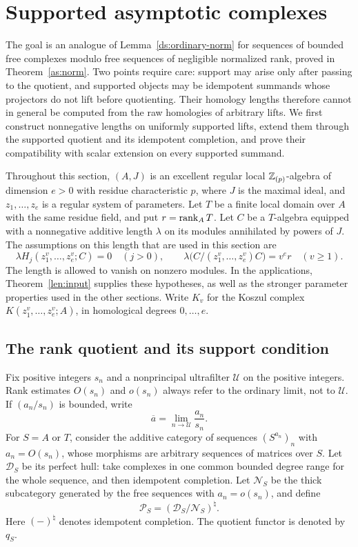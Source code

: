 \section{Supported asymptotic complexes}
\label{sec:asymptotic}

The goal is an analogue of Lemma~\ref{ds:ordinary-norm} for sequences of
bounded free complexes modulo free sequences of negligible normalized
rank, proved in Theorem~\ref{as:norm}. Two points require care: support
may arise only after passing to the quotient, and supported objects may
be idempotent summands whose projectors do not lift before quotienting.
Their homology lengths therefore cannot in general be computed from the
raw homologies of arbitrary lifts. We first construct nonnegative lengths
on uniformly supported lifts, extend them through the supported quotient
and its idempotent completion, and prove their compatibility with scalar
extension on every supported summand.

Throughout this section, $(A,J)$ is an excellent regular local
$\mathbb{Z}_{(p)}$-algebra of dimension $e>0$ with residue characteristic $p$,
where $J$ is the maximal ideal, and $z_1,\ldots,z_e$ is a regular system
of parameters. Let $T$ be a finite
local domain over $A$ with the same residue field, and put
$r=\operatorname{rank}_A T$. Let $C$ be a $T$-algebra equipped with a nonnegative
additive length $\lambda$ on its modules annihilated by powers of $J$.
The assumptions on this length that are used in this section are
\begin{equation}
 \lambda H_j(z_1^v,\ldots,z_e^v;C)=0\quad(j>0),
 \qquad
 \lambda\bigl(C/(z_1^v,\ldots,z_e^v)C\bigr)=v^e r
 \quad(v\geq 1).
 \label{as:length-hypotheses}
\end{equation}
The length is allowed to vanish on nonzero modules. In the applications,
Theorem~\ref{len:input} supplies these hypotheses, as well as the stronger
parameter properties used in the other sections. Write $K_v$ for the
Koszul complex $K(z_1^v,\ldots,z_e^v;A)$, in homological degrees
$0,\ldots,e$.

\subsection{The rank quotient and its support condition}

Fix positive integers $s_n$ and a nonprincipal ultrafilter $\mathcal U$
on the positive integers. Rank estimates $O(s_n)$ and $o(s_n)$ always
refer to the ordinary limit, not to $\mathcal U$. If $(a_n/s_n)$ is
bounded, write
\[
 \overline a=\lim_{n\to\mathcal U}\frac{a_n}{s_n}.
\]
For $S=A$ or $T$, consider the additive category of sequences
$(S^{a_n})_n$ with $a_n=O(s_n)$, whose morphisms are arbitrary
sequences of matrices over $S$. Let $\mathcal D_S$ be its perfect
hull: take complexes in one common bounded degree range for the whole
sequence, and then idempotent completion. Let
$\mathcal N_S$ be the thick subcategory generated by the free
sequences with $a_n=o(s_n)$, and define
\[
 \mathcal P_S=(\mathcal D_S/\mathcal N_S)^{\natural}.
\]
Here $(-)^{\natural}$ denotes idempotent completion. The quotient
functor is denoted by $q_S$.

